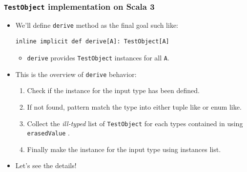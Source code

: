 \begin{frame}[fragile]
  \frametitle{\lstinline|TestObject| implementation on Scala 3}

  \begin{itemize}
    \item We'll define \lstinline|derive| method as the final goal such like:
\begin{lstlisting}[style=scala]
inline implicit def derive[A]: TestObject[A]
\end{lstlisting}   
    \begin{itemize}
      \item \lstinline|derive| provides \lstinline|TestObject| instances for all \lstinline|A|.
    \end{itemize}

    \item This is the overview of \lstinline|derive| behavior:
    \begin{enumerate}
      \item Check if the instance for the input type has been defined.
      \item If not found, pattern match the type into either tuple like or enum like. \label{enum:tuple_or_enum}
      \item Collect the \emph{ill-typed} list of \lstinline|TestObject| for each types contained in 
      using \lstinline|erasedValue| \label{enum:instances_list}.
      \item Finally make the instance for the input type using  instances list.
    \end{enumerate}

    \item Let's see the details!
  \end{itemize}

\end{frame}

